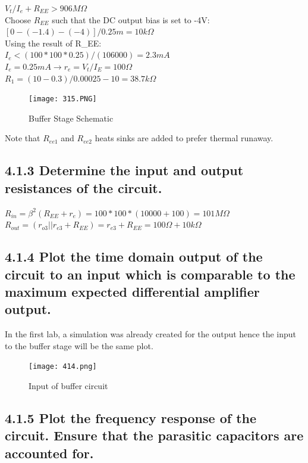 \documentclass[12pt]{article}
\begin{document}
$V_t / I_e + R_{EE} > 906 M \Omega$ \\

Choose $R_{EE}$ such that the DC output bias is set to -4V: \\

$[0 - (-1.4) - (-4)] / 0.25m = 10k \Omega$ \\ 

Using the result of R_{EE}: \\

$I_e < (100 * 100 * 0.25) / (106 000) = 2.3mA$ \\

$I_e = 0.25mA \rightarrow r_e = V_t / I_E = 100 \Omega$ \\

$R_1 = (10 - 0.3) / 0.00025 - 10 = 38.7k \Omega$

\begin{figure}[H]
    \centering
    \texttt{[image: 315.PNG]}
    \caption{Buffer Stage Schematic}
\end{figure}

Note that $R_{ee1}$ and $R_{ee2}$ heats sinks are added to prefer thermal runaway.
    

\subsection*{4.1.3 Determine the input and output resistances of the circuit.}

$R_{in} = \beta^2 (R_{EE} + r_e) = 100 * 100 * (10000 + 100) = 101M \Omega$ \\

$R_{out} = ( r_{o3} || r_{e3} + R_{EE} ) = r_{e3} + R_{EE} = 100 \Omega + 10k \Omega$

\subsection*{4.1.4 Plot the time domain output of the circuit to an input which is comparable to the maximum expected differential amplifier output.}

In the first lab, a simulation was already created for the output hence the input to the buffer stage will be the same plot.

\begin{figure}[H]
\centering
\texttt{[image: 414.png]}
\caption{Input of buffer circuit}
\end{figure}

\subsection*{4.1.5 Plot the frequency response of the circuit. Ensure that the parasitic capacitors are accounted for.}
\end{document}
